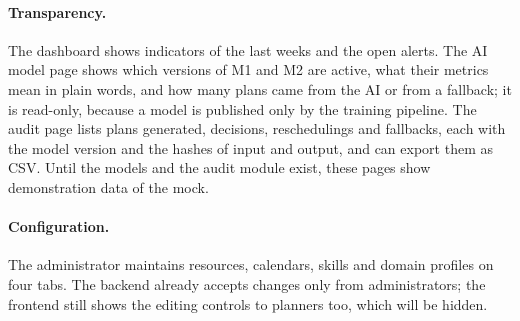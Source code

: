 \paragraph{Transparency.} The dashboard shows indicators of the last weeks and the open alerts.
The AI model page shows which versions of M1 and M2 are active, what their metrics mean in plain
words, and how many plans came from the AI or from a fallback; it is read-only, because a model
is published only by the training pipeline. The audit page lists plans generated, decisions,
reschedulings and fallbacks, each with the model version and the hashes of input and output, and
can export them as CSV. Until the models and the audit module exist, these pages show
demonstration data of the mock.

\paragraph{Configuration.} The administrator maintains resources, calendars, skills and domain
profiles on four tabs. The backend already accepts changes only from administrators; the
frontend still shows the editing controls to planners too, which will be hidden.

